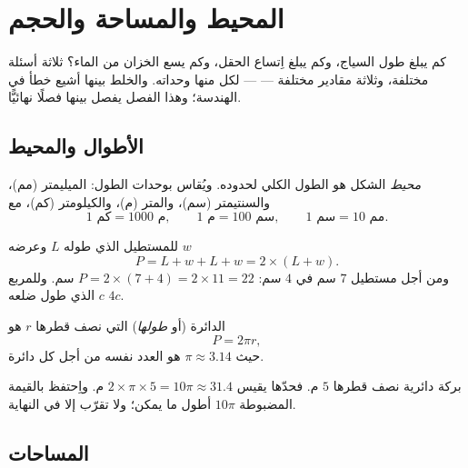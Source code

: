 \chapter{المحيط والمساحة والحجم}\label{ch:g6:measure}

كم يبلغ طول السياج، وكم يبلغ اِتساع الحقل، وكم يسع الخزان من
الماء؟ ثلاثة أسئلة مختلفة، وثلاثة مقادير مختلفة ---
   --- لكل منها وحداته. والخلط بينها
أشيع خطأ في الهندسة؛ وهذا الفصل يفصل بينها فصلًا
نهائيًّا.

\section{الأطوال والمحيط}

\begin{definition}[المحيط]\label{def:g6:measure:perimeter}
\emph{محيط} الشكل هو الطول الكلي
لحدوده. ويُقاس بوحدات الطول: الميليمتر (مم)،
والسنتيمتر (سم)، والمتر (م)، والكيلومتر (كم)، مع
\[
1 \text{ كم} = 1000 \text{ م}, \qquad
1 \text{ م} = 100 \text{ سم}, \qquad
1 \text{ سم} = 10 \text{ مم}.
\]
\end{definition}

\begin{example}\label{ex:g6:measure:perimeter}
للمستطيل الذي طوله $L$ وعرضه $w$ 
\[
P = L + w + L + w = 2 \times (L + w).
\]
ومن أجل مستطيل $7$ سم في $4$ سم: $P = 2 \times (7 + 4) = 2 \times 11 =
22$ سم. وللمربع الذي طول ضلعه $c$  $4c$.
\end{example}

\begin{proposition}\label{prop:g6:measure:circle}
 الدائرة (أو \emph{طولها}) التي نصف قطرها $r$ هو
\[
P = 2 \pi r ,
\]
حيث $\pi \approx 3.14$ هو العدد نفسه من أجل كل دائرة.
\end{proposition}
\admitted

\begin{example}
بركة دائرية نصف قطرها $5$ م. فحدّها يقيس
$2 \times \pi \times 5 = 10\pi \approx 31.4$ م. واِحتفظ بالقيمة المضبوطة
$10\pi$ أطول ما يمكن؛ ولا تقرّب إلا في النهاية.
\end{example}

\section{المساحات}

